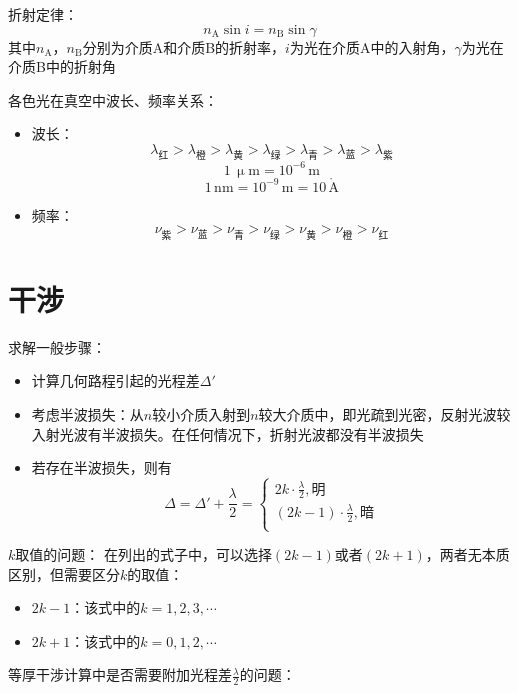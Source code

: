 \documentclass[12pt, a4paper, twoside]{ctexbook}
\begin{document}
{\sonti 折射定律}：
$$
n_\mathrm{A}\sin i=n_\mathrm{B}\sin \gamma
$$
其中$n_\mathrm{A}$，$n_\mathrm{B}$分别为介质A和介质B的折射率，$i$为光在介质A中的入射角，$\gamma$为光在介质B中的折射角

{\sonti 各色光在真空中波长、频率关系}：
\begin{itemize}
    \item 波长：
    $$
    \lambda_\text{红}>\lambda_\text{橙}>\lambda_\text{黄}>\lambda_\text{绿}>\lambda_\text{青}>\lambda_\text{蓝}>\lambda_\text{紫}
    $$
    $$
    1\,\upmu\mathrm{m}=10^{-6}\,\mathrm{m}
    $$
    $$
    1\,\mathrm{nm}=10^{-9}\,\mathrm{m}=10\,\mathring{\mathrm{A}}
    $$
    \item 频率：
    $$
    \nu_\text{紫}>\nu_\text{蓝}>\nu_\text{青}>\nu_\text{绿}>\nu_\text{黄}>\nu_\text{橙}>\nu_\text{红}
    $$
\end{itemize}
\section{干涉}
{\sonti 求解一般步骤}：
\begin{itemize}
    \item 计算几何路程引起的光程差$\Delta'$
    \item 考虑半波损失：从$n$较小介质入射到$n$较大介质中，即光疏到光密，反射光波较入射光波有半波损失。在任何情况下，折射光波都没有半波损失
    \item 若存在半波损失，则有
    $$
    \Delta=\Delta'+\frac{\lambda}{2}=
    \left\{ \begin{array}{l}
        2k\cdot \frac{\lambda}{2},\text{明}\\
        \left( 2k-1 \right) \cdot \frac{\lambda}{2},\text{暗}\\
    \end{array} \right. 
    $$
\end{itemize}

{\sonti $k$取值的问题}：
在列出的式子中，可以选择$\left(2k-1\right)$或者$\left(2k+1\right)$，两者无本质区别，但需要区分$k$的取值：
\begin{itemize}
    \item $2k-1$：该式中的$k=1,2,3,\cdots$
    \item $2k+1$：该式中的$k=0,1,2,\cdots$
\end{itemize}

{\sonti 等厚干涉计算中是否需要附加光程差}$\frac{\lambda}{2}${\sonti 的问题}：
\end{document}

